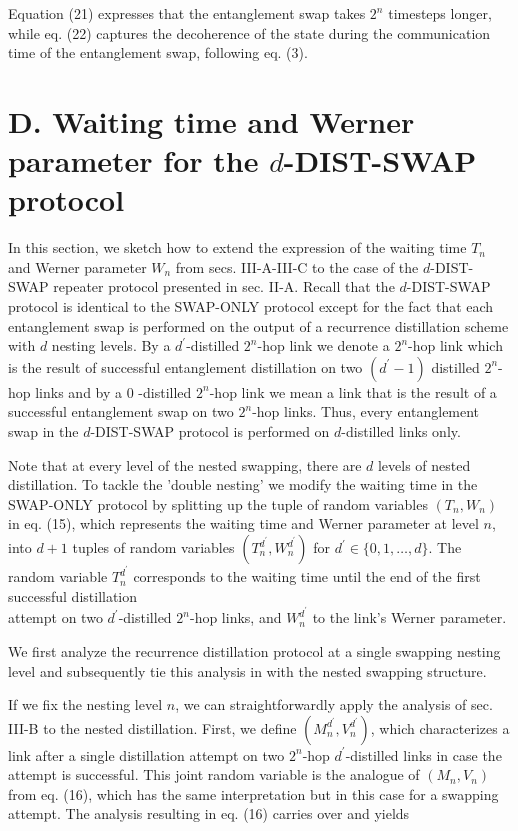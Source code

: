 \documentclass[10pt]{article}
\begin{document}
Equation (21) expresses that the entanglement swap takes $2^{n}$ timesteps longer, while eq. (22) captures the decoherence of the state during the communication time of the entanglement swap, following eq. (3).

\section*{D. Waiting time and Werner parameter for the $d$-DIST-SWAP protocol}
In this section, we sketch how to extend the expression of the waiting time $T_{n}$ and Werner parameter $W_{n}$ from secs. III-A-III-C to the case of the $d$-DIST-SWAP repeater protocol presented in sec. II-A. Recall that the $d$-DIST-SWAP protocol is identical to the SWAP-ONLY protocol except for the fact that each entanglement swap is performed on the output of a recurrence distillation scheme with $d$ nesting levels. By a $d^{\prime}$-distilled $2^{n}$-hop link we denote a $2^{n}$-hop link which is the result of successful entanglement distillation on two $\left(d^{\prime}-1\right)$ distilled $2^{n}$-hop links and by a 0 -distilled $2^{n}$-hop link we mean a link that is the result of a successful entanglement swap on two $2^{n}$-hop links. Thus, every entanglement swap in the $d$-DIST-SWAP protocol is performed on $d$-distilled links only.

Note that at every level of the nested swapping, there are $d$ levels of nested distillation. To tackle the 'double nesting' we modify the waiting time in the SWAP-ONLY protocol by splitting up the tuple of random variables $\left(T_{n}, W_{n}\right)$ in eq. (15), which represents the waiting time and Werner parameter at level $n$, into $d+1$ tuples of random variables $\left(T_{n}^{d^{\prime}}, W_{n}^{d^{\prime}}\right)$ for $d^{\prime} \in\{0,1, \ldots, d\}$. The random variable $T_{n}^{d^{\prime}}$ corresponds to the waiting time until the end of the first successful distillation\\
attempt on two $d^{\prime}$-distilled $2^{n}$-hop links, and $W_{n}^{d^{\prime}}$ to the link's Werner parameter.

We first analyze the recurrence distillation protocol at a single swapping nesting level and subsequently tie this analysis in with the nested swapping structure.

If we fix the nesting level $n$, we can straightforwardly apply the analysis of sec. III-B to the nested distillation. First, we define $\left(M_{n}^{d^{\prime}}, V_{n}^{d^{\prime}}\right)$, which characterizes a link after a single distillation attempt on two $2^{n}$-hop $d^{\prime}$-distilled links in case the attempt is successful. This joint random variable is the analogue of $\left(M_{n}, V_{n}\right)$ from eq. (16), which has the same interpretation but in this case for a swapping attempt. The analysis resulting in eq. (16) carries over and yields
\end{document}
